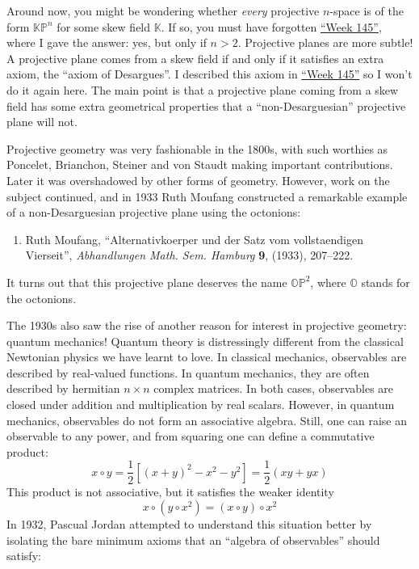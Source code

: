 \documentclass{article}
\def\tightlist{}
\begin{document}
Around now, you might be wondering whether \emph{every} projective
\(n\)-space is of the form \(\mathbb{KP}^n\) for some skew field
\(\mathbb{K}\). If so, you must have forgotten
\protect\hyperlink{week145}{``Week 145''}, where I gave the answer: yes,
but only if \(n>2\). Projective planes are more subtle! A projective
plane comes from a skew field if and only if it satisfies an extra
axiom, the ``axiom of Desargues''. I described this axiom in
\protect\hyperlink{week145}{``Week 145''} so I won't do it again here.
The main point is that a projective plane coming from a skew field has
some extra geometrical properties that a ``non-Desarguesian'' projective
plane will not.

Projective geometry was very fashionable in the 1800s, with such
worthies as Poncelet, Brianchon, Steiner and von Staudt making important
contributions. Later it was overshadowed by other forms of geometry.
However, work on the subject continued, and in 1933 Ruth Moufang
constructed a remarkable example of a non-Desarguesian projective plane
using the octonions:

\begin{enumerate}
\def\labelenumi{\arabic{enumi})}
\setcounter{enumi}{4}
\tightlist
\item
  Ruth Moufang, ``Alternativkoerper und der Satz vom vollstaendigen
  Vierseit'', \emph{Abhandlungen Math. Sem. Hamburg} \textbf{9}, (1933),
  207--222.
\end{enumerate}

It turns out that this projective plane deserves the name
\(\mathbb{OP}^2\), where \(\mathbb{O}\) stands for the octonions.

The 1930s also saw the rise of another reason for interest in projective
geometry: quantum mechanics! Quantum theory is distressingly different
from the classical Newtonian physics we have learnt to love. In
classical mechanics, observables are described by real-valued functions.
In quantum mechanics, they are often described by hermitian
\(n\times n\) complex matrices. In both cases, observables are closed
under addition and multiplication by real scalars. However, in quantum
mechanics, observables do not form an associative algebra. Still, one
can raise an observable to any power, and from squaring one can define a
commutative product:
\[x \circ y = \frac12[(x+y)^2 - x^2 - y^2] = \frac12(xy + yx)\] This
product is not associative, but it satisfies the weaker identity
\[x\circ (y\circ x^2) = (x\circ y)\circ x^2\] In 1932, Pascual Jordan
attempted to understand this situation better by isolating the bare
minimum axioms that an ``algebra of observables'' should satisfy:
\end{document}

